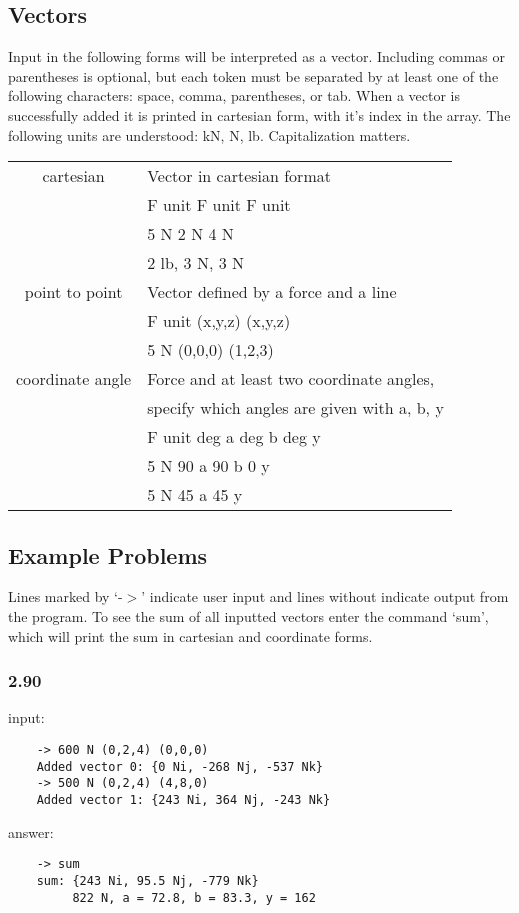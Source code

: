 \documentclass[a4paper, 12pt] {report}
\begin{document}
\pagebreak
\subsection*{Vectors}
Input in the following forms will be interpreted as a vector. Including commas or
parentheses is optional, but each token must be separated by at least one of the
following characters: space, comma, parentheses, or tab. When a vector is
successfully added it is printed in cartesian form, with it's index in the array.
The following units are understood: kN, N, lb. Capitalization matters.
\begin{center}
  \begin{tabular}{| c | l |}
    \hline
      cartesian & Vector in cartesian format \\
                & F unit F unit F unit \\
                & 5 N 2 N 4 N \\
                & 2 lb, 3 N, 3 N \\
    \hline
      point to point & Vector defined by a force and a line \\
                     & F unit (x,y,z) (x,y,z) \\
                     & 5 N (0,0,0) (1,2,3) \\
    \hline
      coordinate angle & Force and at least two coordinate angles, \\
                       &  specify which angles are given with a, b, y\\
                       & F unit deg a deg b deg y \\
                       & 5 N 90 a 90 b 0 y \\
                       & 5 N 45 a 45 y \\
    \hline
  \end{tabular}
\end{center}

\subsection*{Example Problems}
\lstset{language=bash, showstringspaces=false, basicstyle=\scriptsize, 
  columns=fixed, extendedchars=true, 
  frame=single, breaklines=true}

  Lines marked by `-$>$' indicate user input and lines without indicate output from the 
  program.  To see the sum of all inputted vectors enter the command `sum', which will 
  print the sum in cartesian and coordinate forms.
  \subsubsection*{2.90}
    input:
    \begin{lstlisting}
    -> 600 N (0,2,4) (0,0,0)
    Added vector 0: {0 Ni, -268 Nj, -537 Nk}
    -> 500 N (0,2,4) (4,8,0)
    Added vector 1: {243 Ni, 364 Nj, -243 Nk}
    \end{lstlisting}
    answer:
    \begin{lstlisting}
    -> sum
    sum: {243 Ni, 95.5 Nj, -779 Nk}
         822 N, a = 72.8, b = 83.3, y = 162
    \end{lstlisting}
\end{document}
